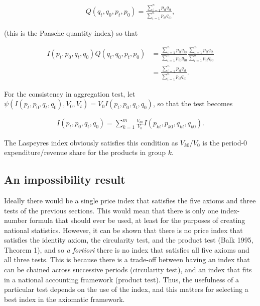 \documentclass[]{article}
\begin{document}
\begin{align*}
Q(q_{t}, q_{0}, p_{t}, p_{0}) = \frac{\sum_{i = 1}^{n} p_{it}q_{it}}{\sum_{i = 1}^{n} p_{it}q_{i0}},
\end{align*}

(this is the Paasche quantity index) so that

\begin{align*}
I(p_{t}, p_{0}, q_{t}, q_{0}) Q(q_{t}, q_{0}, p_{t}, p_{0}) &= \frac{\sum_{i = 1}^{n} p_{it}q_{i0}}{\sum_{i = 1}^{n} p_{i0}q_{i0}} \frac{\sum_{i = 1}^{n} p_{it}q_{it}}{\sum_{i = 1}^{n} p_{it}q_{i0}} \\
&= \frac{\sum_{i = 1}^{n} p_{it}q_{it}}{\sum_{i = 1}^{n} p_{it}q_{i0}}.
\end{align*}

For the consistency in aggregation test, let \(\psi(I(p_{t}, p_{0}, q_{t}, q_{0}), V_{0}, V_{t}) = V_0 I(p_{t}, p_{0}, q_{t}, q_{0})\), so that the test becomes

\begin{align*}
I(p_{t}, p_{0}, q_{t}, q_{0}) = \sum_{k = 1}^{m} \frac{V_{k0}}{V_0} I(p_{kt}, p_{k0}, q_{kt}, q_{k0}).
\end{align*}

The Laspeyres index obviously satisfies this condition as \(V_{k0} / V_0\) is the period-0 expenditure/revenue share for the products in group \(k\).

\hypertarget{an-impossibility-result}{%
\subsection{An impossibility result}\label{an-impossibility-result}}

Ideally there would be a single price index that satisfies the five axioms and three tests of the previous sections. This would mean that there is only one index-number formula that should ever be used, at least for the purposes of creating national statistics. However, it can be shown that there is no price index that satisfies the identity axiom, the circularity test, and the product test (Balk 1995, Theorem 1), and so \emph{a fortiori} there is no index that satisfies all five axioms and all three tests. This is because there is a trade-off between having an index that can be chained across successive periods (circularity test), and an index that fits in a national accounting framework (product test). Thus, the usefulness of a particular test depends on the use of the index, and this matters for selecting a best index in the axiomatic framework.
\end{document}
